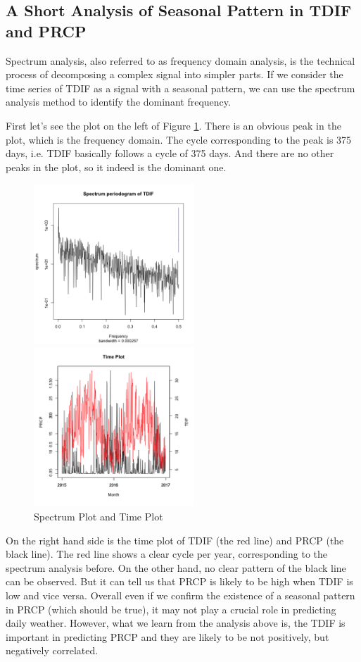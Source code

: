 \subsection{A Short Analysis of Seasonal Pattern in TDIF and PRCP}

Spectrum analysis\cite{priestley1981spectral}, also referred to as frequency domain analysis, is the technical process of decomposing a complex signal into simpler parts. If we consider the time series of TDIF as a signal with a seasonal pattern, we can use the spectrum analysis method to identify the dominant frequency.

First let's see the plot on the left of Figure \ref{patt}. There is an obvious peak in the plot, which is the frequency domain. The cycle corresponding to the peak is 375 days, i.e. TDIF basically follows a cycle of 375 days. And there are no other peaks in the plot, so it indeed is the dominant one.

\begin{figure}[h]
\centering
\begin{minipage}[t]{0.48\textwidth}
\centering
\includegraphics[width=6cm]{patt1.png}
\end{minipage}
\begin{minipage}[t]{0.48\textwidth}
\centering
\includegraphics[width=6cm]{patt2.png}
\end{minipage}
\caption{Spectrum Plot and Time Plot}
\label{patt}
\end{figure}

On the right hand side is the time plot of TDIF (the red line) and PRCP (the black line). The red line shows a clear cycle per year, corresponding to the spectrum analysis before. On the other hand, no clear pattern of the black line can be observed. But it can tell us that PRCP is likely to be high when TDIF is low and vice versa. Overall even if we confirm the existence of a seasonal pattern in PRCP (which should be true), it may not play a crucial role in predicting daily weather. However, what we learn from the analysis above is, the TDIF is important in predicting PRCP and they are likely to be not positively, but negatively correlated.